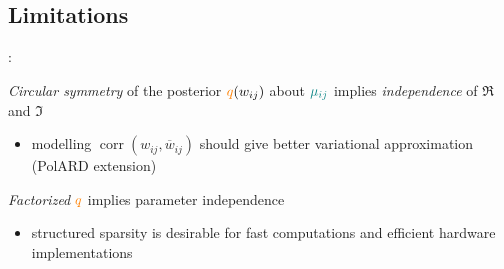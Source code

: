 \documentclass[handout]{beamer}
\newcommand{\cplx}{\mathbb{C}}
\newcommand{\conj}[1]{\overline{#1}}
\newcommand{\iu}{{\jmath}}
\begin{document}

\subsection{Limitations} %
\label{sec:limitations}

\begin{frame}[c]{\insertsection: \insertsubsection}

  \emph{Circular symmetry} of the posterior ${\color{orange} q}(w_{ij})$ about
  ${\color{teal} \mu_{ij}}$ implies \emph{independence} of $\Re$ and $\Im$
  \begin{itemize}
    \item modelling $
      \mathop{corr}(w_{ij}, \conj{w}_{ij})
    $ should give better variational approximation (PolARD extension)
  \end{itemize}

  \bigskip
  \emph{Factorized} ${\color{orange} q}$ implies parameter independence %
  \begin{itemize}
    \item structured sparsity is desirable for fast computations and efficient
      hardware implementations
  \end{itemize}

\end{frame}




\end{document}
